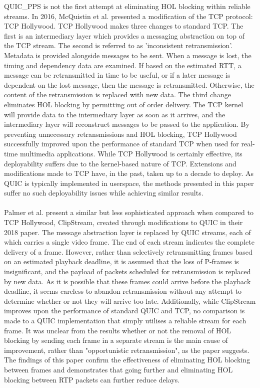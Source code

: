 \documentclass{mpaper}
\begin{document}
\noindent QUIC\_PPS is not the first attempt at eliminating HOL blocking within reliable streams. In 2016, McQuistin et al. presented a modification of the TCP protocol: TCP Hollywood\cite{Hollywood}. TCP Hollywood makes three changes to standard TCP. The first is an intermediary layer which provides a messaging abstraction on top of the TCP stream. The second is referred to as 'inconsistent retransmission'. Metadata is provided alongside messages to be sent. When a message is lost, the timing and dependency data are examined. If based on the estimated RTT, a message can be retransmitted in time to be useful, or if a later message is dependent on the lost message, then the message is retransmitted. Otherwise, the content of the retransmission is replaced with new data. The third change eliminates HOL blocking by permitting out of order delivery. The TCP kernel will provide data to the intermediary layer as soon as it arrives, and the intermediary layer will reconstruct messages to be passed to the application. By preventing unnecessary retransmissions and HOL blocking, TCP Hollywood successfully improved upon the performance of standard TCP when used for real-time multimedia applications. While TCP Hollywood is certainly effective, its deployability suffers due to the kernel-based nature of TCP. Extensions and modifications made to TCP have, in the past, taken up to a decade to deploy\cite{Fukuda}. As QUIC is typically implemented in userspace, the methods presented in this paper suffer no such deployability issues while achieving similar results.
\\\\
Palmer et al. present a similar but less sophisticated approach when compared to TCP Hollywood, ClipStream, created through modifications to QUIC in their 2018 paper\cite{ClipStream}. The message abstraction layer is replaced by QUIC streams, each of which carries a single video frame. The end of each stream indicates the complete delivery of a frame. However, rather than selectively retransmitting frames based on an estimated playback deadline, it is assumed that the loss of P-frames is insignificant, and the payload of packets scheduled for retransmission is replaced by new data. As it is possible that these frames could arrive before the playback deadline, it seems careless to abandon retransmission without any attempt to determine whether or not they will arrive too late. Additionally, while ClipStream improves upon the performance of standard QUIC and TCP, no comparison is made to a QUIC implementation that simply utilises a reliable stream for each frame. It was unclear from the results whether or not the removal of HOL blocking by sending each frame in a separate stream is the main cause of improvement, rather than "opportunistic retransmission", as the paper suggests. The findings of this paper confirm the effectiveness of eliminating HOL blocking between frames and demonstrates that going further and eliminating HOL blocking between RTP packets can further reduce delays.
\end{document}
